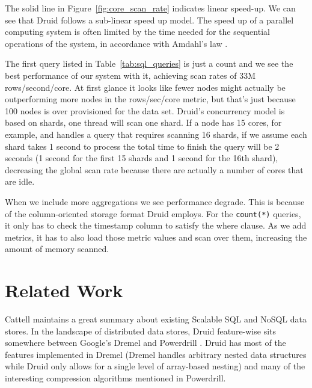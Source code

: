 \documentclass{vldb}
\begin{document}
The solid line in Figure~\ref{fig:core_scan_rate} indicates linear speed-up. We can see that Druid
follows a sub-linear speed up model. The speed up of a parallel computing system is often limited
by the time needed for the sequential operations of the system, in accordance with Amdahl's law \cite{amdahl1967validity}.

The first query listed in Table~\ref{tab:sql_queries} is just a count and we see the best
performance of our system with it, achieving scan rates of 33M
rows/second/core. At first glance it looks like fewer nodes might
actually be outperforming more nodes in the rows/sec/core metric, but
that's just because 100 nodes is over provisioned for the data set.
Druid's concurrency model is based on shards, one thread will scan one
shard. If a node has 15 cores, for example, and handles a query that
requires scanning 16 shards, if we assume each shard takes 1 second to
process the total time to finish the query will be 2 seconds (1 second
for the first 15 shards and 1 second for the 16th shard), decreasing
the global scan rate because there are actually a number of cores that
are idle.

When we include more aggregations we see performance degrade.  This is
because of the column-oriented storage format Druid employs.  For the
\texttt{count(*)} queries, it only has to check the timestamp column to satisfy
the where clause.  As we add metrics, it has to also load those metric
values and scan over them, increasing the amount of memory scanned.

\section{Related Work}
\label{sec:related}
Cattell \cite{cattell2011scalable} maintains a great summary about existing Scalable SQL and
NoSQL data stores. In the landscape of distributed data stores, Druid
feature-wise sits somewhere between Google’s Dremel \cite{melnik2010dremel} and Powerdrill
\cite{hall2012processing}. Druid has most of the features implemented in Dremel (Dremel
handles arbitrary nested data structures while Druid only allows for a
single level of array-based nesting) and many of the interesting
compression algorithms mentioned in Powerdrill.
\end{document}
